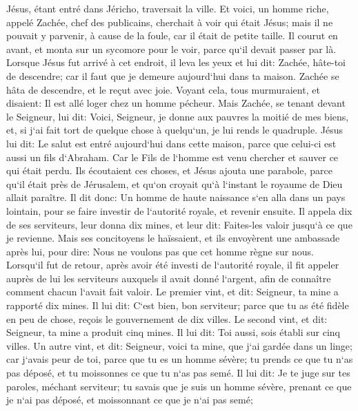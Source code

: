 \verse Jésus, étant entré dans Jéricho, traversait la ville. 
\verse Et voici, un homme riche, appelé Zachée, chef des publicains, cherchait à voir qui était Jésus; 
\verse mais il ne pouvait y parvenir, à cause de la foule, car il était de petite taille. 
\verse Il courut en avant, et monta sur un sycomore pour le voir, parce qu`il devait passer par là. 
\verse Lorsque Jésus fut arrivé à cet endroit, il leva les yeux et lui dit: Zachée, hâte-toi de descendre; car il faut que je demeure aujourd`hui dans ta maison. 
\verse Zachée se hâta de descendre, et le reçut avec joie. 
\verse Voyant cela, tous murmuraient, et disaient: Il est allé loger chez un homme pécheur. 
\verse Mais Zachée, se tenant devant le Seigneur, lui dit: Voici, Seigneur, je donne aux pauvres la moitié de mes biens, et, si j`ai fait tort de quelque chose à quelqu`un, je lui rends le quadruple. 
\verse Jésus lui dit: Le salut est entré aujourd`hui dans cette maison, parce que celui-ci est aussi un fils d`Abraham. 
\verse Car le Fils de l`homme est venu chercher et sauver ce qui était perdu. 
\verse Ils écoutaient ces choses, et Jésus ajouta une parabole, parce qu`il était près de Jérusalem, et qu`on croyait qu`à l`instant le royaume de Dieu allait paraître. 
\verse Il dit donc: Un homme de haute naissance s`en alla dans un pays lointain, pour se faire investir de l`autorité royale, et revenir ensuite. 
\verse Il appela dix de ses serviteurs, leur donna dix mines, et leur dit: Faites-les valoir jusqu`à ce que je revienne. 
\verse Mais ses concitoyens le haïssaient, et ils envoyèrent une ambassade après lui, pour dire: Nous ne voulons pas que cet homme règne sur nous. 
\verse Lorsqu`il fut de retour, après avoir été investi de l`autorité royale, il fit appeler auprès de lui les serviteurs auxquels il avait donné l`argent, afin de connaître comment chacun l`avait fait valoir. 
\verse Le premier vint, et dit: Seigneur, ta mine a rapporté dix mines. 
\verse Il lui dit: C`est bien, bon serviteur; parce que tu as été fidèle en peu de chose, reçois le gouvernement de dix villes. 
\verse Le second vint, et dit: Seigneur, ta mine a produit cinq mines. 
\verse Il lui dit: Toi aussi, sois établi sur cinq villes. 
\verse Un autre vint, et dit: Seigneur, voici ta mine, que j`ai gardée dans un linge; 
\verse car j`avais peur de toi, parce que tu es un homme sévère; tu prends ce que tu n`as pas déposé, et tu moissonnes ce que tu n`as pas semé. 
\verse Il lui dit: Je te juge sur tes paroles, méchant serviteur; tu savais que je suis un homme sévère, prenant ce que je n`ai pas déposé, et moissonnant ce que je n`ai pas semé; 
